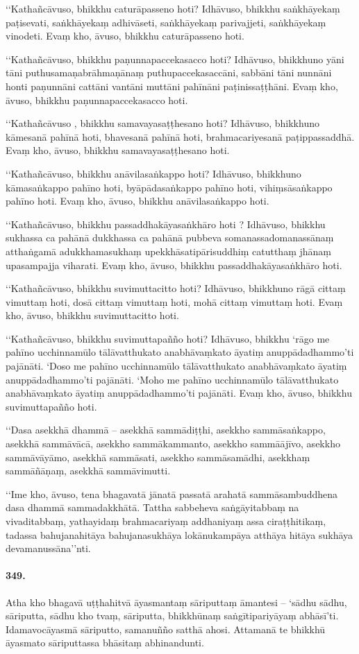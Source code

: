 ‘‘Kathañcāvuso, bhikkhu caturāpasseno hoti? Idhāvuso, bhikkhu saṅkhāyekaṃ paṭisevati, saṅkhāyekaṃ adhivāseti, saṅkhāyekaṃ parivajjeti, saṅkhāyekaṃ vinodeti. Evaṃ kho, āvuso, bhikkhu caturāpasseno hoti.

‘‘Kathañcāvuso, bhikkhu paṇunnapaccekasacco hoti? Idhāvuso, bhikkhuno yāni tāni puthusamaṇabrāhmaṇānaṃ puthupaccekasaccāni, sabbāni tāni nunnāni honti paṇunnāni cattāni vantāni muttāni pahīnāni paṭinissaṭṭhāni. Evaṃ kho, āvuso, bhikkhu paṇunnapaccekasacco hoti.

‘‘Kathañcāvuso , bhikkhu samavayasaṭṭhesano hoti? Idhāvuso, bhikkhuno kāmesanā pahīnā hoti, bhavesanā pahīnā hoti, brahmacariyesanā paṭippassaddhā. Evaṃ kho, āvuso, bhikkhu samavayasaṭṭhesano hoti.

‘‘Kathañcāvuso, bhikkhu anāvilasaṅkappo hoti? Idhāvuso, bhikkhuno kāmasaṅkappo pahīno hoti, byāpādasaṅkappo pahīno hoti, vihiṃsāsaṅkappo pahīno hoti. Evaṃ kho, āvuso, bhikkhu anāvilasaṅkappo hoti.

‘‘Kathañcāvuso, bhikkhu passaddhakāyasaṅkhāro hoti ? Idhāvuso, bhikkhu sukhassa ca pahānā dukkhassa ca pahānā pubbeva somanassadomanassānaṃ atthaṅgamā adukkhamasukhaṃ upekkhāsatipārisuddhiṃ catutthaṃ jhānaṃ upasampajja viharati. Evaṃ kho, āvuso, bhikkhu passaddhakāyasaṅkhāro hoti.

‘‘Kathañcāvuso, bhikkhu suvimuttacitto hoti? Idhāvuso, bhikkhuno rāgā cittaṃ vimuttaṃ hoti, dosā cittaṃ vimuttaṃ hoti, mohā cittaṃ vimuttaṃ hoti. Evaṃ kho, āvuso, bhikkhu suvimuttacitto hoti.

‘‘Kathañcāvuso, bhikkhu suvimuttapañño hoti? Idhāvuso, bhikkhu ‘rāgo me pahīno ucchinnamūlo tālāvatthukato anabhāvaṃkato āyatiṃ anuppādadhammo’ti pajānāti. ‘Doso me pahīno ucchinnamūlo tālāvatthukato anabhāvaṃkato āyatiṃ anuppādadhammo’ti pajānāti. ‘Moho me pahīno ucchinnamūlo tālāvatthukato anabhāvaṃkato āyatiṃ anuppādadhammo’ti pajānāti. Evaṃ kho, āvuso, bhikkhu suvimuttapañño hoti.

‘‘Dasa asekkhā dhammā – asekkhā sammādiṭṭhi, asekkho sammāsaṅkappo, asekkhā sammāvācā, asekkho sammākammanto, asekkho sammāājīvo, asekkho sammāvāyāmo, asekkhā sammāsati, asekkho sammāsamādhi, asekkhaṃ sammāñāṇaṃ, asekkhā sammāvimutti.

‘‘Ime kho, āvuso, tena bhagavatā jānatā passatā arahatā sammāsambuddhena dasa dhammā sammadakkhātā. Tattha sabbeheva saṅgāyitabbaṃ na vivaditabbaṃ, yathayidaṃ brahmacariyaṃ addhaniyaṃ assa ciraṭṭhitikaṃ, tadassa bahujanahitāya bahujanasukhāya lokānukampāya atthāya hitāya sukhāya devamanussāna’’nti.

\paragraph{349.} Atha kho bhagavā uṭṭhahitvā āyasmantaṃ sāriputtaṃ āmantesi – ‘sādhu sādhu, sāriputta, sādhu kho tvaṃ, sāriputta, bhikkhūnaṃ saṅgītipariyāyaṃ abhāsī’ti. Idamavocāyasmā sāriputto, samanuñño satthā ahosi. Attamanā te bhikkhū āyasmato sāriputtassa bhāsitaṃ abhinandunti.

